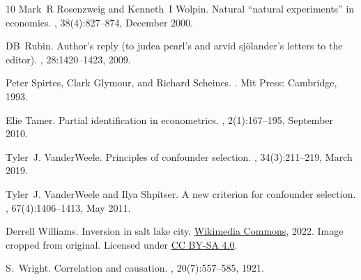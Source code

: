 \documentclass[11pt]{amsart}
\begin{document}
\begin{thebibliography}{10}
Mark~R Rosenzweig and Kenneth~I Wolpin.
\newblock Natural {\textquotedblleft}natural experiments{\textquotedblright} in economics.
, 38(4):827--874, December 2000.

DB~Rubin.
\newblock Author’s reply (to judea pearl’s and arvid sj{\"o}lander’s letters to the editor).
, 28:1420--1423, 2009.

Peter Spirtes, Clark Glymour, and Richard Scheines.
.
\newblock Mit Press: Cambridge, 1993.

Elie Tamer.
\newblock Partial identification in econometrics.
, 2(1):167--195, September 2010.

Tyler~J. VanderWeele.
\newblock Principles of confounder selection.
, 34(3):211–219, March 2019.

Tyler~J. VanderWeele and Ilya Shpitser.
\newblock A new criterion for confounder selection.
, 67(4):1406–1413, May 2011.

Derrell Williams.
\newblock Inversion in salt lake city.
\newblock \href{https://commons.wikimedia.org/w/index.php?curid=114387838}{Wikimedia Commons}, 2022.
\newblock Image cropped from original. Licensed under \href{https://creativecommons.org/licenses/by-sa/4.0/}{CC BY-SA 4.0}.

S.~Wright.
\newblock Correlation and causation.
, 20(7):557--585, 1921.

\end{thebibliography}
\end{document}
